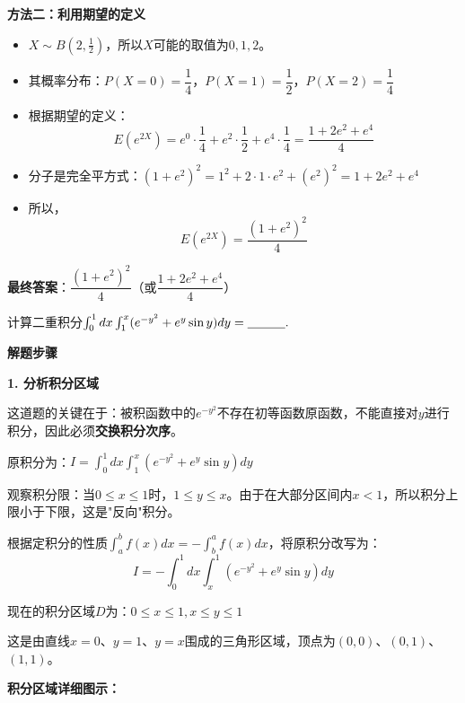 \documentclass[standard]{ExBook}
\begin{document}
\begin{qitems}
\begin{bbox}
\begin{solution}
            \textbf{方法二：利用期望的定义}
            
            \begin{itemize}
                \item $X\sim B(2, \frac{1}{2})$，所以$X$可能的取值为$0, 1, 2$。
                \item 其概率分布：$P(X=0) = \dfrac{1}{4}$，$P(X=1) = \dfrac{1}{2}$，$P(X=2) = \dfrac{1}{4}$
                \item 根据期望的定义：
                    $$E(e^{2X}) = e^{0} \cdot \frac{1}{4} + e^{2} \cdot \frac{1}{2} + e^{4} \cdot \frac{1}{4} = \frac{1+2e^2+e^4}{4}$$
                \item 分子是完全平方式：$(1+e^2)^2 = 1^2 + 2 \cdot 1 \cdot e^2 + (e^2)^2 = 1+2e^2+e^4$
                \item 所以，$$E(e^{2X}) = \frac{(1+e^2)^2}{4}$$
            \end{itemize}
            
            \textbf{最终答案}：$\dfrac{(1+e^2)^2}{4}$（或$\dfrac{1+2e^2+e^4}{4}$）
        \end{solution}
    \end{bbox}

    \begin{bbox}
        \qitem 计算二重积分$\int_0^1 dx \int_1^x (e^{-y^2} + e^y \sin y)dy=\underline{\hspace{3em}}.$
        \begin{solution}
            \textbf{解题步骤}
            
            \textbf{1. 分析积分区域}
            
            这道题的关键在于：被积函数中的$e^{-y^2}$不存在初等函数原函数，不能直接对$y$进行积分，因此必须\textbf{交换积分次序}。
            
            原积分为：$I = \int_0^1 dx \int_1^x (e^{-y^2} + e^y \sin y)dy$
            
            观察积分限：当$0 \le x \le 1$时，$1 \le y \le x$。由于在大部分区间内$x < 1$，所以积分上限小于下限，这是"反向"积分。
            
            根据定积分的性质$\int_a^b f(x)dx = -\int_b^a f(x)dx$，将原积分改写为：
            $$I = -\int_0^1 dx \int_x^1 (e^{-y^2} + e^y \sin y)dy$$
            
            现在的积分区域$D$为：$0 \le x \le 1, x \le y \le 1$
            
            这是由直线$x=0$、$y=1$、$y=x$围成的三角形区域，顶点为$(0,0)$、$(0,1)$、$(1,1)$。
            
            \textbf{积分区域详细图示：}
            

\end{solution}
\end{bbox}
\end{qitems}
\end{document}
